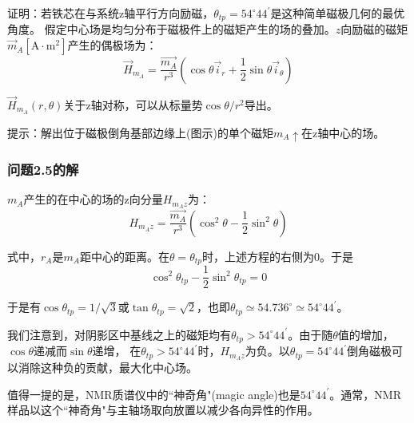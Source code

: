 证明：若铁芯在与系统z轴平行方向励磁，$\theta_{tp}=54^\circ 44^\prime$是这种简单磁极几何的最优角度。
假定中心场是均匀分布于磁极件上的磁矩产生的场的叠加。$z$向励磁的磁矩$\vec{m}_A [\mathrm{A\cdot m^2}]$产生的偶极场为：
\begin{equation}
\vec{H}_{m_A}=\frac{\vec{m_A}}{r^3}(\cos\theta \vec{i}_r+\frac{1}{2}\sin\theta\vec{i}_\theta)
\end{equation}

$\vec{H}_{m_A}(r,\theta)$关于z轴对称，可以从标量势$\cos\theta/r^2$导出。

提示：解出位于磁极倒角基部边缘上(图示)的单个磁矩$m_A \uparrow$在z轴中心的场。

\subsubsection*{问题2.5的解}
$m_A$产生的在中心的场的z向分量$H_{m_A z}$为：
\begin{equation*}
H_{m_A z}=\frac{\vec{m_A}}{r^3}(\cos^2\theta-\frac{1}{2}\sin^2\theta) \tag{S5.1}
\end{equation*}

式中，$r_A$是$m_A$距中心的距离。在$\theta=\theta_{tp}$时，上述方程的右侧为0。于是
\begin{equation*}
\cos^2\theta_{tp}-\frac{1}{2}\sin^2\theta_{tp}=0 \tag{S5.2}
\end{equation*}

于是有$\cos\theta_{tp}=1/\sqrt{3}$或$\tan\theta_{tp}=\sqrt{2}$，也即$\theta_{tp}\simeq 54.736^\circ\simeq54^\circ 44^\prime$。

我们注意到，对阴影区中基线之上的磁矩均有$\theta_{tp}>54^\circ 44^\prime$。由于随$\theta$值的增加，$\cos\theta$递减而$\sin\theta$递增，
在$\theta_{tp}>54^\circ 44^\prime$时，$H_{m_A z}$为负。以$\theta_{tp}=54^\circ 44^\prime$倒角磁极可以消除这种负的贡献，最大化中心场。

值得一提的是，NMR质谱仪中的``神奇角"(magic angle)也是$54^\circ 44^\prime$。通常，NMR样品以这个``神奇角"与主轴场取向放置以减少各向异性的作用。

